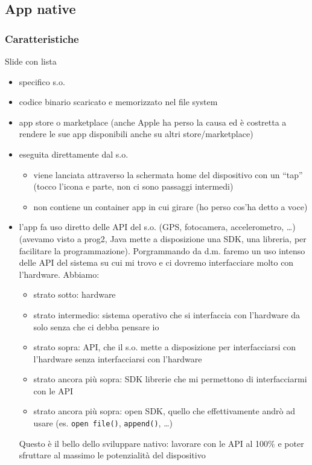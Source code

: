 \subsection{App native}
\subsubsection{Caratteristiche}
Slide con lista
\begin{itemize}
    \item specifico s.o.
    \item codice binario scaricato e memorizzato nel file system
    \item app store o marketplace (anche Apple ha perso la causa ed è costretta a rendere le sue app disponibili anche su altri store/marketplace)
    \item eseguita direttamente dal s.o. 
    \begin{itemize}
        \item viene lanciata attraverso la schermata home del dispositivo con un ``tap'' (tocco l'icona e parte, non ci sono passaggi intermedi)
        \item non contiene un container app in cui girare (ho perso cos'ha detto a voce)
    \end{itemize}
    \item l'app fa uso diretto delle API del s.o. (GPS, fotocamera, accelerometro, \dots) (avevamo visto a prog2, Java mette a disposizione una SDK, una libreria, per facilitare la programmazione). Porgrammando da d.m. faremo un uso intenso delle API del sistema su cui mi trovo e ci dovremo interfacciare molto con l'hardware. Abbiamo:
    \begin{itemize}
        \item strato sotto: hardware
        \item strato intermedio: sistema operativo che si interfaccia con l'hardware da solo senza che ci debba pensare io
        \item strato sopra: API, che il s.o. mette a disposizione per interfacciarsi con l'hardware senza interfacciarsi con l'hardware
        \item strato ancora più sopra: SDK librerie che mi permettono di interfacciarmi con le API
        \item strato ancora più sopra: open SDK, quello che effettivamente andrò ad usare (es. \texttt{open file()}, \texttt{append()}, \dots)
    \end{itemize}
    Questo è il bello dello sviluppare nativo: lavorare con le API al 100\% e poter sfruttare al massimo le potenzialità del dispositivo
\end{itemize}

